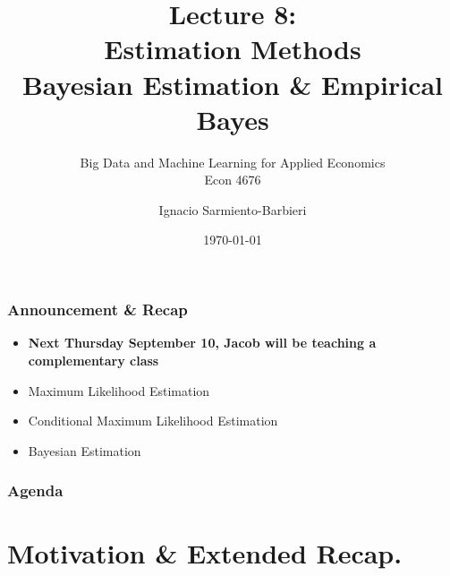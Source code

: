 \documentclass[
  shownotes,
  xcolor={svgnames},
  hyperref={colorlinks,citecolor=DarkBlue,linkcolor=DarkRed,urlcolor=DarkBlue}
  ]{beamer}
\begin{document}
\title[Lecture 8]{Lecture 8: \\ Estimation Methods \\  Bayesian Estimation \& Empirical Bayes}
\subtitle{Big Data and Machine Learning for Applied Economics \\ Econ 4676}
\date{\today}

\author[Sarmiento-Barbieri]{Ignacio Sarmiento-Barbieri}


\begin{frame}[noframenumbering]
\maketitle
\end{frame}



\begin{frame}
\frametitle{Announcement \& Recap}


\begin{itemize} 
    \item {\bf Next Thursday September 10, Jacob will be teaching a complementary class} 
    \bigskip
    \item Maximum Likelihood Estimation
    \bigskip
    \item Conditional Maximum Likelihood Estimation
    \bigskip
    \item Bayesian Estimation
  
\end{itemize}
\end{frame}


\begin{frame}
\frametitle{Agenda}

\tableofcontents


\end{frame}



\section{Motivation \& Extended Recap.}
\end{document}
